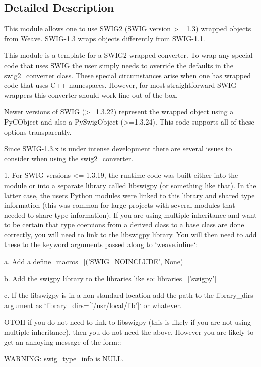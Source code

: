\subsection{Detailed Description}
\begin{DoxyVerb}This module allows one to use SWIG2 (SWIG version >= 1.3) wrapped
objects from Weave.  SWIG-1.3 wraps objects differently from SWIG-1.1.

This module is a template for a SWIG2 wrapped converter.  To wrap any
special code that uses SWIG the user simply needs to override the
defaults in the swig2_converter class.  These special circumstances
arise when one has wrapped code that uses C++ namespaces.  However,
for most straightforward SWIG wrappers this converter should work fine
out of the box.

Newer versions of SWIG (>=1.3.22) represent the wrapped object using a
PyCObject and also a PySwigObject (>=1.3.24).  This code supports all
of these options transparently.

Since SWIG-1.3.x is under intense development there are several issues
to consider when using the swig2_converter.

 1. For SWIG versions <= 1.3.19, the runtime code was built either
    into the module or into a separate library called libswigpy (or
    something like that).  In the latter case, the users Python
    modules were linked to this library and shared type information
    (this was common for large projects with several modules that
    needed to share type information).  If you are using multiple
    inheritance and want to be certain that type coercions from a
    derived class to a base class are done correctly, you will need to
    link to the libswigpy library.  You will then need to add these to
    the keyword arguments passed along to `weave.inline`:

      a. Add a define_macros=[('SWIG_NOINCLUDE', None)]

      b. Add the swigpy library to the libraries like so:
         libraries=['swigpy']

      c. If the libswigpy is in a non-standard location add the path
         to the library_dirs argument as
         `library_dirs=['/usr/local/lib']` or whatever.

    OTOH if you do not need to link to libswigpy (this is likely if
    you are not using multiple inheritance), then you do not need the
    above.  However you are likely to get an annoying message of the
    form::

      WARNING: swig_type_info is NULL.


\end{DoxyVerb}
